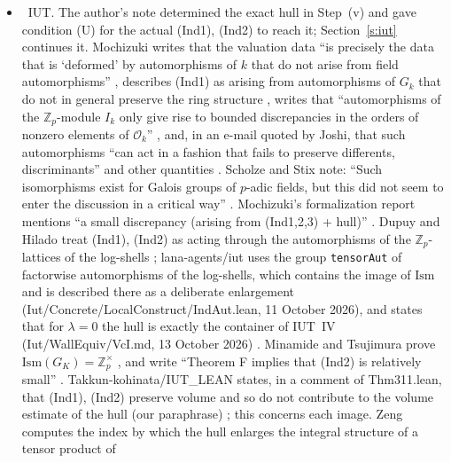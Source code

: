 \documentclass[11pt,a4paper]{article}
\newcommand{\Zp}{\mathbb{Z}_p}
\newcommand{\Qp}{\mathbb{Q}_p}
\newcommand{\cO}{\mathcal{O}}
\newcommand{\leanus}{\textunderscore\allowbreak}
\newcommand{\lean}[1]{{\ttfamily\let\_\leanus #1}}
\newcommand{\lab}[2]{{\upshape\fcolorbox{#1}{#1!8}{\scriptsize\sffamily\bfseries\textcolor{#1}{#2}}}}
\newcommand{\tagS}{\lab{blue}{S}}
\theoremstyle{plain}
\theoremstyle{definition}
\theoremstyle{remark}
\begin{document}
\begin{itemize}
Theorem~\ref{t:wingberg}). Those automorphisms fix $x_0$ and $x_1$, so they do not move the line of $y_1$, and the
paper does not consider the ring of integers or $(\Qp)_+$. Kumpitsch's Jannsen--Wingberg automorphisms and combinatorial Dehn
twists \cite[Prop.~3.2.4, Thm.~7.5.5]{Ku} and Gropper's arithmetic Dehn twists \cite{Gr} do not concern the movement of
the ring of integers either. For $p=2$, Nishio studies the outer automorphism groups of the absolute Galois groups of
$2$-adic fields \cite{Nishio25}.
\item \tagS\ IUT. The author's note \cite{Tiers} determined the exact hull in Step~(v) and gave condition (U) for the
actual (Ind1), (Ind2) to reach it; Section~\ref{s:iut} continues it. Mochizuki writes that the valuation data ``is
precisely the data that is `deformed' by automorphisms of $k$ that do not arise from field automorphisms''
\cite[\S I3]{AbsTopIII}, describes (Ind1) as arising from automorphisms of $G_k$ that do not in general preserve the
ring structure \cite[\S3.7(i)]{Alien}, writes that ``automorphisms of the $\Zp$-module $I_k$ only give rise to bounded
discrepancies in the orders of nonzero elements of $\cO_k$'' \cite[Ex.~3.5.1]{EssLgc}, and, in an e-mail quoted by
Joshi, that such automorphisms ``can act in a fashion that fails to preserve differents, discriminants'' and other
quantities \cite[Appendix~16]{JoshiAnab}. Scholze and Stix note: ``Such isomorphisms exist for Galois groups of
$p$-adic fields, but this did not seem to enter the discussion in a critical way'' \cite[fn.~4]{SS}. Mochizuki's
formalization report mentions ``a small discrepancy (arising from (Ind1,2,3) + hull)'' \cite[p.~11]{Fm26}. Dupuy and
Hilado treat (Ind1), (Ind2) as acting through the automorphisms of the $\Zp$-lattices of the log-shells
\cite[p.~17, \S4.8]{DH1}; lana-agents/iut uses the group \texttt{tensorAut} of factorwise automorphisms of the
log-shells, which contains the image of $\mathrm{Ism}$ and is described there as a deliberate enlargement
(\lean{Iut/Concrete/LocalConstruct/IndAut.lean}, 11 October 2026), and states that for $\lambda=0$ the hull is exactly
the container of IUT~IV (\lean{Iut/WallEquiv/VcI.md}, 13 October 2026) \cite{lana}. Minamide and Tsujimura prove
$\mathrm{Ism}(G_K)=\Zp^{\times}$ \cite[Thm.~F, Thm.~7.4]{MT}, and write ``Theorem F implies that (Ind2) is relatively small'' \cite{MT}. Takkun-kohinata/IUT\_LEAN states, in a comment of \lean{Thm311.lean}, that (Ind1), (Ind2)
preserve volume and so do not contribute to the volume estimate of the hull (our paraphrase) \cite{Takkun}; this
concerns each image. Zeng computes the index by which the hull enlarges the integral structure of a tensor product of

\end{itemize}
\end{document}

